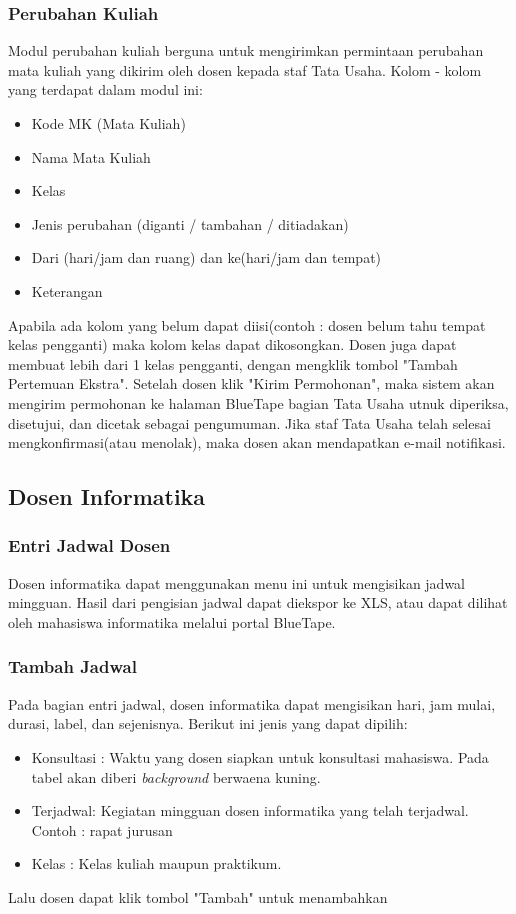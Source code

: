 \subsubsection{Perubahan Kuliah}
Modul perubahan kuliah berguna untuk mengirimkan permintaan perubahan mata kuliah yang dikirim oleh dosen kepada staf Tata Usaha. Kolom - kolom yang terdapat dalam modul ini:
\begin{itemize}
	\item Kode MK (Mata Kuliah)
	\item Nama Mata Kuliah
	\item Kelas
	\item Jenis perubahan (diganti / tambahan / ditiadakan)
	\item Dari (hari/jam dan ruang) dan ke(hari/jam dan tempat)
	\item Keterangan
\end{itemize}
Apabila ada kolom yang belum dapat diisi(contoh : dosen belum tahu tempat kelas pengganti) maka kolom kelas dapat dikosongkan.
Dosen juga dapat membuat lebih dari 1 kelas pengganti, dengan mengklik tombol "Tambah Pertemuan Ekstra".
Setelah dosen klik "Kirim Permohonan", maka sistem akan mengirim permohonan ke halaman BlueTape bagian Tata Usaha utnuk diperiksa, disetujui, dan dicetak sebagai pengumuman. Jika staf Tata Usaha telah selesai mengkonfirmasi(atau menolak), maka dosen akan mendapatkan e-mail notifikasi.

\subsection{Dosen Informatika}
\subsubsection{Entri Jadwal Dosen}
Dosen informatika dapat menggunakan menu ini untuk mengisikan jadwal mingguan. Hasil dari pengisian jadwal dapat diekspor ke XLS, atau dapat dilihat oleh mahasiswa informatika melalui portal BlueTape.
\subsubsection{Tambah Jadwal}
Pada bagian entri jadwal, dosen informatika dapat mengisikan hari, jam mulai, durasi, label, dan sejenisnya. Berikut ini jenis yang dapat dipilih:
\begin{itemize}
	\item Konsultasi : Waktu yang dosen siapkan untuk konsultasi mahasiswa. Pada tabel akan diberi \textit{background} berwaena kuning.
	\item Terjadwal: Kegiatan mingguan dosen informatika yang telah terjadwal. Contoh : rapat jurusan
	\item Kelas : Kelas kuliah maupun praktikum.
\end{itemize}
Lalu dosen dapat klik tombol "Tambah" untuk menambahkan


